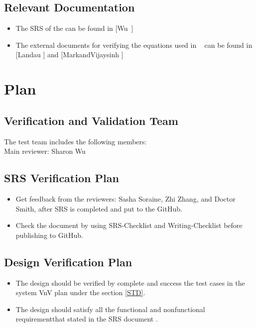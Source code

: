 \documentclass[12pt, titlepage]{article}
\begin{document}
\subsection{Relevant Documentation}\label{RD}

\begin{itemize} 
\item[ ]The SRS of the \progname can be found in [Wu~\cite{YS2019}] 
\item[ ]The external documents for verifying the equations used in \progname~
can be found in [Landau \cite{Charles2001} ] and
[MarkandVijaysinh\cite{JacobsonandJadhav} ]

 \end{itemize} 

 \section{Plan}	
\subsection{Verification and Validation Team} The test team includes the
following members:\\ Main reviewer: Sharon Wu\\ 
\subsection{SRS Verification Plan}

\begin{itemize}

\item Get feedback from the reviewers: Sasha Soraine, Zhi Zhang, and Doctor
Smith, after SRS is completed and put to the GitHub.
\item Check the document by using SRS-Checklist and Writing-Checklist before
publishing to GitHub.

\end{itemize}


\subsection{Design Verification Plan}
\begin{itemize}

\item The design should be verified by complete and success the test cases in
the system VnV plan under the section \ref{STD}.
\item The design should satisfy all the functional and nonfunctional
requirementthat stated in the SRS document \cite{YS2019}.

\end{itemize}
\end{document}
